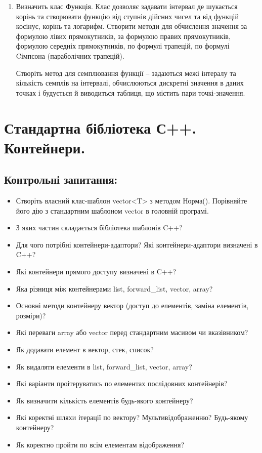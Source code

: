 \documentclass[a5paper,titlepage,openany,twoside,draft]{book_unv}%
\begin{document}
\begin{enumerate}
\item
Визначить клас Функція. Клас дозволяє задавати інтервал де шукається корінь та створювати функцію 
від ступнів дійсних чисел та від функцій косінус, корінь та логарифм. 
Створити методи для обчислення значення за формулою лівих прямокутників, 
за формулою правих прямокутників, формулою середніх прямокутників, 
по формулі трапецій, по формулі Cімпсона (параболічних трапецій).

Створіть метод для семплювання функції -- задаються межі інтералу та кількість 
семплів на інтервалі, обчислюються дискретні значення в даних точках і будується
 й виводиться таблиця, що містить пари точкі-значення.

\end{enumerate}


\chapter{Стандартна бібліотека С++. Контейнери.}
%

\section{Контрольні запитання:}
\begin{itemize}
\item
  Створіть власний клас-шаблон vector\textless{}T\textgreater{} з
  методом Норма(). Порівняйте його дію з стандартним шаблоном vector в
  головній програмі.
\item
  З яких частин складається бібліотека шаблонів C++?
\item
  Для чого потрібні контейнери-адаптори? Які контейнери-адаптори
  визначені в C++?
\item
  Які контейнери прямого доступу визначені в C++?
\item
  Яка різниця між контейнерами list, forward\_list, vector, array?
\item
  Основні методи контейнеру вектор (доступ до елементів, заміна
  елементів, розміри)?
\item
  Які переваги array або vector перед стандартним масивом чи
  вказівником?
\item
  Як додавати елемент в вектор, стек, список?
\item
  Як видаляти елементи в list, forward\_list, vector, array?
\item
  Які варіанти проітеруватись по елементах послідовних контейнерів?

\item
Як визначити кількість елементів будь-якого контейнеру?
\item
Які коректні шляхи ітерації по вектору? Мультивідображенню? Будь-якому
контейнеру?
\item
Як коректно пройти по всім елементам відображення?

\end{itemize}
\end{document}
